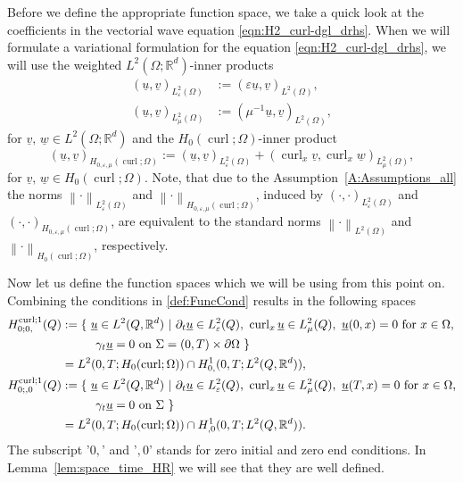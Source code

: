\documentclass[a4paper,11pt]{article}
\newcommand{\R}{\mathbb R}
\newcommand{\cu}{\operatorname{curl}}
\renewcommand{\vec}[1]{\underline{#1}}
\newcommand{\norm}[1]{{\left\lVert{#1}\right\rVert}}
\begin{document}
Before we define the appropriate function space, we take a quick look at the coefficients in the vectorial wave equation \eqref{eqn:H2_curl-dgl_drhs}. When we will formulate a variational formulation for the equation \eqref{eqn:H2_curl-dgl_drhs}, we will use the weighted $L^2(\Omega;\R^d)$-inner products
\begin{align*}
	(\vec u, \vec v)_{L^2_\varepsilon(\Omega)} &:= \left( \varepsilon \vec u, \vec v \right)_{L^2(\Omega)} ,\\
	(\vec u, \vec v)_{L^2_\mu(\Omega)} &:=  \left( \mu^{-1} \vec u, \vec v \right)_{L^2(\Omega)} ,
\end{align*}
for $\vec v, \, \vec w \in L^2(\Omega;\R^d)$ and the $H_0(\cu;\Omega)$-inner product
\begin{equation*}
	(\vec u, \vec v)_{H_{0,\varepsilon,\mu}(\cu;\Omega)} := (\vec u, \vec v)_{L^2_\varepsilon(\Omega)} +  (\cu_x\vec v,\cu_x \vec w)_{L^2_\mu(\Omega)},
\end{equation*}
for $ \vec v, \, \vec w \in H_0(\cu;\Omega).$
Note, that due to the Assumption~\ref{A:Assumptions_all} the norms $\norm{\cdot}_{L^2_\varepsilon(\Omega)}$ and $\norm{\cdot}_{H_{0,\varepsilon,\mu}(\cu;\Omega)}$, induced by $(\cdot, \cdot)_{L^2_\varepsilon(\Omega)}$ and $(\cdot, \cdot)_{H_{0,\varepsilon,\mu}(\cu;\Omega)}$, are equivalent to the standard norms $\norm{\cdot}_{L^2(\Omega)}$ and $\norm{\cdot}_{H_0(\cu;\Omega)}$, respectively.


Now let us define the function spaces which we will be using from this point on.  Combining the conditions in \eqref{def:FuncCond} results in  the following spaces 
\begin{align}
	\nonumber
	H^{\cu;1}_{0;0,}(Q) &:=  \{\ \vec u\in L^2(Q,\R^d) \ | \  \partial_t \vec u\in L^2_{\varepsilon}(Q),\ \cu_x \vec u\in L^2_{\mu}(Q),\ \vec u(0,x)= 0 \textmd{ for } x\in \Omega,\\
	\label{def:spaceHC10,}
	&\hspace*{1cm} \gamma_t \vec u = 0 \textmd{ on }\Sigma = (0,T)\times\partial \Omega \   \}\\
	\nonumber
	&= L^2(0,T;H_0(\cu;\Omega))\cap H^1_{0,}(0,T;L^2(Q,\R^d)),\\
	\nonumber
	H^{\cu;1}_{0;,0}(Q) &:=  \{\ \vec u\in L^2(Q,\R^d) \ | \  \partial_t\vec  u\in L^2_{\varepsilon}(Q),\ \cu_x \vec u\in L^2_{\mu}(Q),\ \vec u(T,x)= 0 \textmd{ for } x\in \Omega,\\
	\label{def:spaceHC1,0}
	&\hspace*{1cm} \gamma_t \vec u = 0 \textmd{ on }\Sigma \   \}\\
	\nonumber
	&= L^2(0,T;H_0(\cu;\Omega))\cap H^1_{,0}(0,T;L^2(Q,\R^d)).
\end{align}
The subscript '$0,$' and '$,0$' stands for zero initial and zero end conditions. In Lemma~\ref{lem:space_time_HR} we will see that they are well defined.
\end{document}
